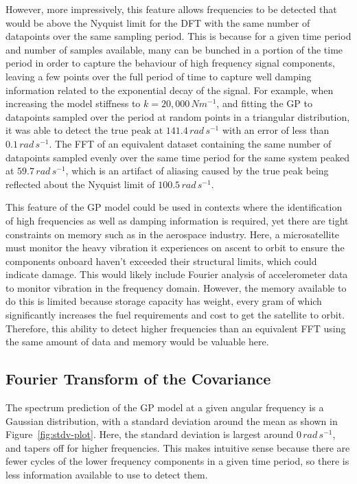 \documentclass[12pt]{article}
\begin{document}
    However, more impressively, this feature allows frequencies to be detected that would be above the Nyquist limit for the DFT with the same number of datapoints over the same sampling period.
    This is because for a given time period and number of samples available, many can be bunched in a portion of the time period in order to capture the behaviour of high frequency signal components, leaving a few points over the full period of time to capture well damping information related to the exponential decay of the signal.
    For example, when increasing the model stiffness to $k = 20,000 \, Nm^{-1}$, and fitting the GP to datapoints sampled over the period at random points in a triangular distribution, it was able to detect the true peak at $141.4 \, rad \, s^{-1}$ with an error of less than $0.1 \, rad \, s^{-1}$.
    The FFT of an equivalent dataset containing the same number of datapoints sampled evenly over the same time period for the same system peaked at $59.7 \, rad \, s^{-1}$, which is an artifact of aliasing caused by the true peak being reflected about the Nyquist limit of $100.5 \, rad \, s^{-1}$.

    This feature of the GP model could be used in contexts where the identification of high frequencies as well as damping information is required, yet there are tight constraints on memory such as in the aerospace industry.
    Here, a microsatellite must monitor the heavy vibration it experiences on ascent to orbit to ensure the components onboard haven't exceeded their structural limits, which could indicate damage.
    This would likely include Fourier analysis of accelerometer data to monitor vibration in the frequency domain.
    However, the memory available to do this is limited because storage capacity has weight, every gram of which significantly increases the fuel requirements and cost to get the satellite to orbit.
    Therefore, this ability to detect higher frequencies than an equivalent FFT using the same amount of data and memory would be valuable here.

    \subsection{Fourier Transform of the Covariance}
    The spectrum prediction of the GP model at a given angular frequency is a Gaussian distribution, with a standard deviation around the mean as shown in Figure~\ref{fig:stdv-plot}.
    Here, the standard deviation is largest around $0 \, rad \, s^{-1}$, and tapers off for higher frequencies.
    This makes intuitive sense because there are fewer cycles of the lower frequency components in a given time period, so there is less information available to use to detect them.
\end{document}

